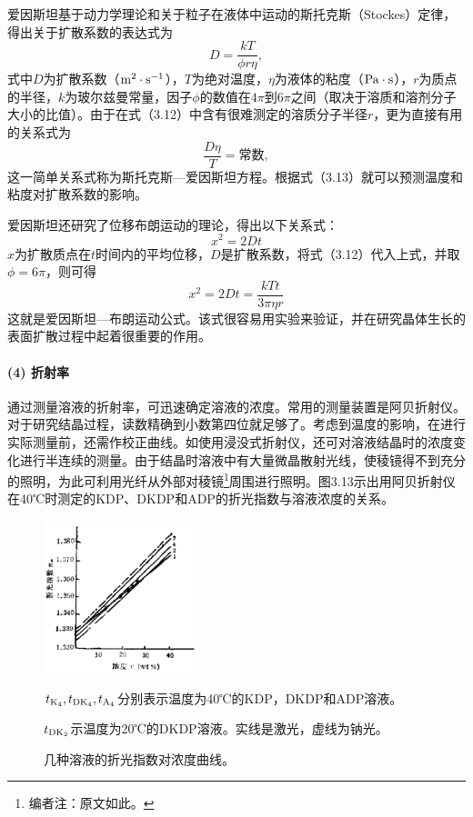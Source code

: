 爱因斯坦基于动力学理论和关于粒子在液体中运动的斯托克斯（Stockes）定律，得出关于扩散系数的表达式为
\begin{equation}
D=\frac{kT}{\phi r\eta},
\end{equation}
式中$D$为扩散系数（$\rm m^2\cdot s^{-1}$），$T$为绝对温度，$\eta$为液体的粘度（$\rm Pa\cdot s$），$r$为质点的半径，$k$为玻尔兹曼常量，因子$\phi$的数值在$4\pi$到$6\pi$之间（取决于溶质和溶剂分子大小的比值）。由于在式（3.12）中含有很难测定的溶质分子半径$r$，更为直接有用的关系式为
\begin{equation}
\frac{D\eta}{T}=\text{常数},
\end{equation}
这一简单关系式称为斯托克斯—爱因斯坦方程。根据式（3.13）就可以预测温度和粘度对扩散系数的影响。

爱因斯坦还研究了位移布朗运动的理论，得出以下关系式：
\begin{equation}
x^2=2Dt
\end{equation}
$x$为扩散质点在$t$时间内的平均位移，$D$是扩散系数，将式（3.12）代入上式，并取$\phi=6\pi$，则可得
\begin{equation}
x^2=2Dt=\frac{kTt}{3\pi\eta r}
\end{equation}
这就是爱因斯坦—布朗运动公式。该式很容易用实验来验证，并在研究晶体生长的表面扩散过程中起着很重要的作用。

\paragraph{(4) 折射率}
通过测量溶液的折射率，可迅速确定溶液的浓度。常用的测量装置是阿贝折射仪。对于研究结晶过程，读数精确到小数第四位就足够了。考虑到温度的影响，在进行实际测量前，还需作校正曲线。如使用浸没式折射仪，还可对溶液结晶时的浓度变化进行半连续的测量。由于结晶时溶液中有大量微晶散射光线，使稜镜得不到充分的照明，为此可利用光纤从外部对稜镜\footnote{编者注：原文如此。}周围进行照明。图3.13示出用阿贝折射仪在40℃时测定的KDP、DKDP和ADP的折光指数与溶液浓度的关系。


\begin{figure}[htb]
 \centering
 \includegraphics[width=0.4\textwidth]{fig/cp03/img3.13.jpg}
 \caption{几种溶液的折光指数对浓度曲线。}
 $t_{\rm K_4}, t_{\rm DK_4},t_{\rm A_4}$分别表示温度为40℃的KDP，DKDP和ADP溶液。
 
 $t_{\rm DK_2}$示温度为20℃的DKDP溶液。实线是激光，虚线为钠光。
\end{figure}

